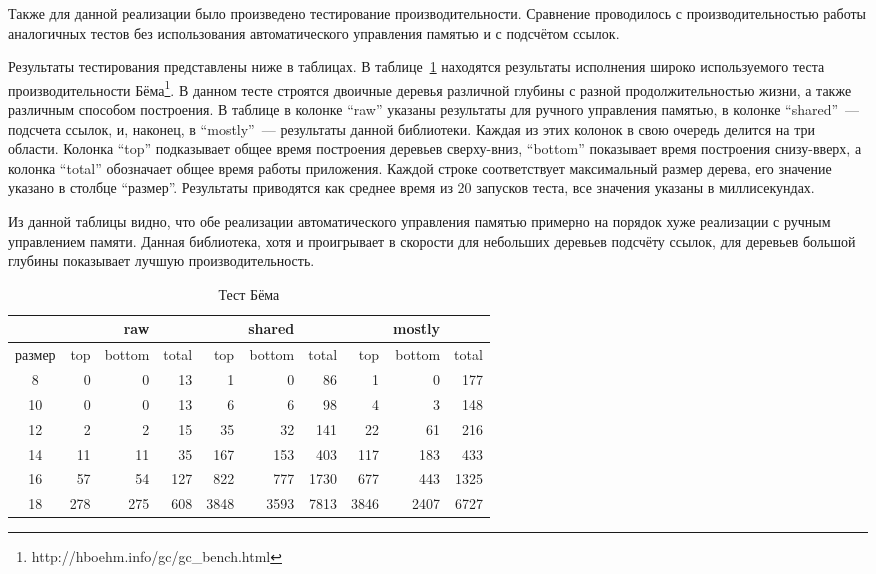 Также для данной реализации было произведено тестирование производительности. Сравнение проводилось с производительностью работы аналогичных тестов без использования автоматического управления памятью и с подсчётом ссылок. 

Результаты тестирования представлены ниже в таблицах.
В таблице~\ref{table:tree} находятся результаты исполнения широко используемого теста производительности Бёма\footnote{http://hboehm.info/gc/gc\_bench.html}. В данном тесте строятся двоичные деревья различной глубины с разной продолжительностью жизни, а также различным способом построения. В таблице в колонке ``raw'' указаны результаты для ручного управления памятью, в колонке ``shared''~--- подсчета ссылок, и, наконец, в ``mostly''~--- результаты данной библиотеки. Каждая из этих колонок в свою очередь делится на три области. Колонка ``top'' подказывает общее время построения деревьев сверху-вниз, ``bottom'' показывает время построения снизу-вверх, а колонка ``total'' обозначает общее время работы приложения. Каждой строке соответствует максимальный размер дерева, его значение указано в столбце ``размер''. Результаты приводятся как среднее время из 20 запусков теста, все значения указаны в миллисекундах.

Из данной таблицы видно, что обе реализации автоматического управления памятью примерно на порядок хуже реализации с ручным управлением памяти. Данная библиотека, хотя и проигрывает в скорости для небольших деревьев подсчёту ссылок, для деревьев большой глубины показывает лучшую производительность.

\begin{table}
\centering
\begin{tabular}{| c | r r r | r r r | r r r |} 
\hline
& & raw & & & shared & & & mostly & \\
\hline 
размер & top & bottom & total & top & bottom & total & top & bottom & total \\
\hline
8 & 0 & 0 & 13 & 1 & 0 & 86 & 1 & 0 & 177 \\
\hline
10 & 0 & 0 & 13 & 6 & 6 & 98 & 4 & 3 & 148 \\
\hline
12 & 2 & 2 & 15 & 35 & 32 & 141 & 22 & 61 & 216 \\ 
\hline
14 & 11 & 11 & 35 & 167 & 153 & 403 & 117 & 183 & 433 \\
\hline
16 & 57 & 54 & 127 & 822 & 777 & 1730 & 677 & 443 & 1325 \\ 
\hline
18 & 278 & 275 & 608 & 3848 & 3593 & 7813 & 3846 & 2407 & 6727 \\
\hline
\end{tabular}
\caption{Тест Бёма}
\label{table:tree}
\end{table}

